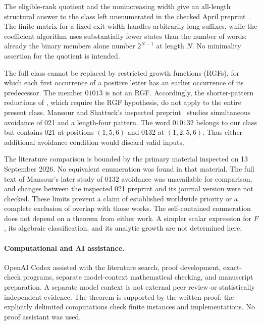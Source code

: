 \documentclass[11pt]{article}
\theoremstyle{remark}
\begin{document}
The eligible-rank quotient and the nonincreasing width give an
all-length structural answer to the class left unenumerated in the
checked April preprint~\cite{LKZ2026}. The finite matrix for a fixed
exit width handles arbitrarily long suffixes, while the coefficient
algorithm uses substantially fewer states than the number of words:
already the binary members alone number $2^{N-1}$ at length $N$.
No minimality assertion for the quotient is intended.

The full class cannot be replaced by restricted growth functions
(RGFs), for which each first occurrence of a positive letter has an
earlier occurrence of its predecessor. The member $01013$ is not an
RGF. Accordingly, the shorter-pattern reductions of
\cite[Lemma~2.2]{LKZ2026}, which require the RGF hypothesis, do not
apply to the entire present class. Mansour and Shattuck's inspected
preprint~\cite{MS2025} studies simultaneous avoidance of 021 and a
length-four pattern. The word $010132$ belongs to our class but
contains 021 at positions $(1,5,6)$ and 0132 at $(1,2,5,6)$.
Thus either additional avoidance condition would discard valid inputs.

The literature comparison is bounded by the primary material inspected
on 13 September 2026. No equivalent enumeration was found in that
material. The full text of Mansour's later study of 0132 avoidance
\cite{Mansour2026} was unavailable for comparison, and changes between
the inspected 021 preprint and its journal version were not checked.
These limits prevent a claim of established worldwide priority or a
complete exclusion of overlap with those works. The self-contained
enumeration does not depend on a theorem from either work. A simpler
scalar expression for $F$, its algebraic classification, and its
analytic growth are not determined here.

\paragraph{Computational and AI assistance.}
OpenAI Codex assisted with the literature search, proof development,
exact-check programs, separate model-context mathematical checking,
and manuscript preparation. A separate model context is not external
peer review or statistically independent evidence. The theorem is
supported by the written proof; the explicitly delimited computations
check finite instances and implementations. No proof assistant was used.



\end{document}

